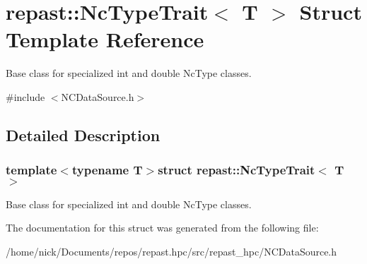 \hypertarget{structrepast_1_1_nc_type_trait}{\section{repast\-:\-:Nc\-Type\-Trait$<$ T $>$ Struct Template Reference}
\label{structrepast_1_1_nc_type_trait}
}


Base class for specialized int and double Nc\-Type classes.  




{\ttfamily \#include $<$N\-C\-Data\-Source.\-h$>$}



\subsection{Detailed Description}
\subsubsection*{template$<$typename T$>$struct repast\-::\-Nc\-Type\-Trait$<$ T $>$}

Base class for specialized int and double Nc\-Type classes. 

The documentation for this struct was generated from the following file\-:\begin{DoxyCompactItemize}
\item 
/home/nick/\-Documents/repos/repast.\-hpc/src/repast\-\_\-hpc/N\-C\-Data\-Source.\-h\end{DoxyCompactItemize}
